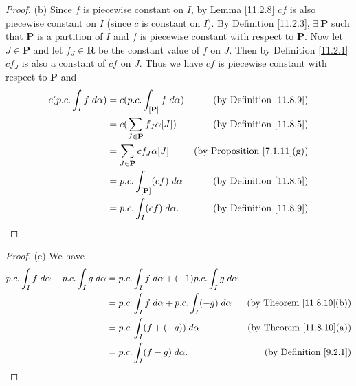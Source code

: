 \begin{proof}{(b)}
    Since \(f\) is piecewise constant on \(I\), by Lemma \ref{11.2.8} \(cf\) is also piecewise constant on \(I\) (since \(c\) is constant on \(I\)).
    By Definition \ref{11.2.3}, \(\exists\ \mathbf{P}\) such that \(\mathbf{P}\) is a partition of \(I\) and \(f\) is piecewise constant with respect to \(\mathbf{P}\).
    Now let \(J \in \mathbf{P}\) and let \(f_J \in \mathbf{R}\) be the constant value of \(f\) on \(J\).
    Then by Definition \ref{11.2.1} \(c f_J\) is also a constant of \(cf\) on \(J\).
    Thus we have \(cf\) is piecewise constant with respect to \(\mathbf{P}\) and
    \begin{align*}
        c (p.c. \int_I f \; d \alpha) & = c (p.c. \int_{[\mathbf{P}]} f \; d \alpha) & \text{(by Definition \ref{11.8.9})}     \\
                                      & = c (\sum_{J \in \mathbf{P}} f_J \alpha[J])  & \text{(by Definition \ref{11.8.5})}     \\
                                      & = \sum_{J \in \mathbf{P}} c f_J \alpha[J]    & \text{(by Proposition \ref{7.1.11}(g))} \\
                                      & = p.c. \int_{[\mathbf{P}]} (c f) \; d \alpha & \text{(by Definition \ref{11.8.5})}     \\
                                      & = p.c. \int_I (c f) \; d \alpha.             & \text{(by Definition \ref{11.8.9})}
    \end{align*}
\end{proof}

\begin{proof}{(c)}
    We have
    \begin{align*}
        p.c. \int_I f \; d \alpha - p.c. \int_I g \; d \alpha & = p.c. \int_I f \; d \alpha + (-1) p.c. \int_I g \; d \alpha                                        \\
                                                              & = p.c. \int_I f \; d \alpha + p.c. \int_I (-g) \; d \alpha   & \text{(by Theorem \ref{11.8.10}(b))} \\
                                                              & = p.c. \int_I (f + (-g)) \; d \alpha                         & \text{(by Theorem \ref{11.8.10}(a))} \\
                                                              & = p.c. \int_I (f - g) \; d \alpha.                           & \text{(by Definition \ref{9.2.1})}
    \end{align*}
\end{proof}

